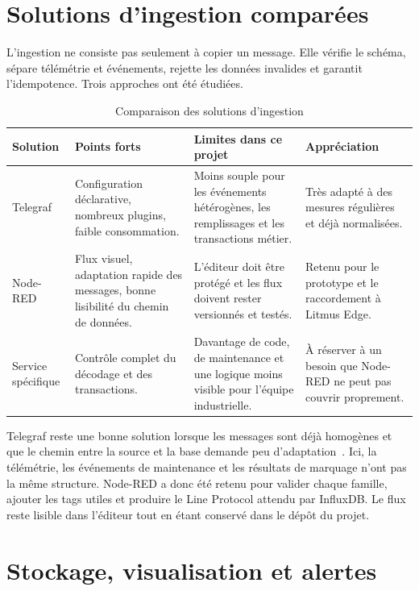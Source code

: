 \section{Solutions d'ingestion comparées}

L'ingestion ne consiste pas seulement à copier un message. Elle vérifie le
schéma, sépare télémétrie et événements, rejette les données invalides et
garantit l'idempotence. Trois approches ont été étudiées.

\begin{table}[H]
\centering
\small
\caption{Comparaison des solutions d'ingestion}
\begin{tabularx}{\textwidth}{>{\raggedright\arraybackslash}p{}YYY}
\toprule
Solution & Points forts & Limites dans ce projet & Appréciation \\
\midrule
Telegraf &
Configuration déclarative, nombreux plugins, faible consommation. &
Moins souple pour les événements hétérogènes, les remplissages et les
transactions métier. &
Très adapté à des mesures régulières et déjà normalisées. \\
Node-RED &
Flux visuel, adaptation rapide des messages, bonne lisibilité du chemin de
données. &
L'éditeur doit être protégé et les flux doivent rester versionnés et testés. &
Retenu pour le prototype et le raccordement à Litmus Edge. \\
Service spécifique &
Contrôle complet du décodage et des transactions. &
Davantage de code, de maintenance et une logique moins visible pour l'équipe
industrielle. &
À réserver à un besoin que Node-RED ne peut pas couvrir proprement. \\
\bottomrule
\end{tabularx}
\end{table}

Telegraf reste une bonne solution lorsque les messages sont déjà homogènes et
que le chemin entre la source et la base demande peu d'adaptation~\cite{telegraf}.
Ici, la télémétrie, les événements de maintenance et les résultats de marquage
n'ont pas la même structure. Node-RED a donc été retenu pour valider chaque
famille, ajouter les tags utiles et produire le Line Protocol attendu par
InfluxDB. Le flux reste lisible dans l'éditeur tout en étant conservé dans le
dépôt du projet.

\section{Stockage, visualisation et alertes}

